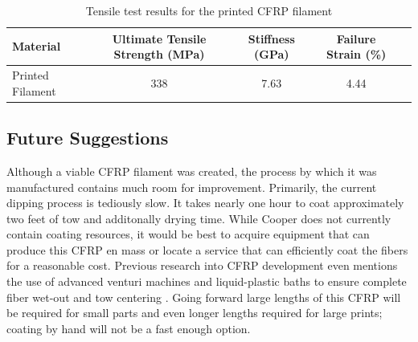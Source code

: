 \begin{table}[h]
    \centering
    \begin{tabular}{lcccc}
        Material           & Ultimate Tensile Strength (MPa)   & Stiffness (GPa)    & Failure Strain (\%)  \\ \hline
		Printed Filament & 338 & 7.63 & 4.44
    \end{tabular}
    \caption{Tensile test results for the printed CFRP filament}
    \label{tab:printed-filament-results}
\end{table}

\clearpage

\subsection{Future Suggestions}

\indent

Although a viable CFRP filament was created, the process by which it was manufactured contains much room for improvement. Primarily, the current dipping process is tediously slow. It takes nearly one hour to coat approximately two feet of tow and additonally drying time. While Cooper does not currently contain coating resources, it would be best to acquire equipment that can produce this CFRP en mass or locate a service that can efficiently coat the fibers for a reasonable cost. Previous research into CFRP development even mentions the use of advanced venturi machines and liquid-plastic baths to ensure complete fiber wet-out and tow centering \cite{Thermoplastic-NASA}. Going forward large lengths of this CFRP will be required for small parts and even longer lengths required for large prints; coating by hand will not be a fast enough option.